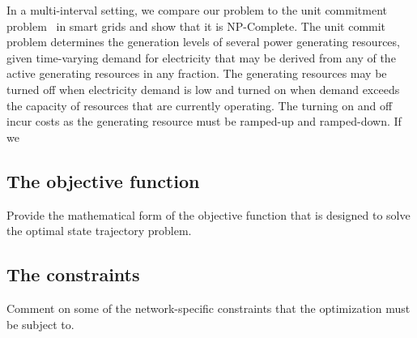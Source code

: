 In a multi-interval setting, we compare our problem to the unit commitment problem~\cite{unitcommit} in smart grids and show that it is NP-Complete. The unit commit problem determines the generation levels of several power generating resources, given time-varying demand for electricity that may be derived from any of the active generating resources in any fraction. The generating resources may be turned off when electricity demand is low and turned on when demand exceeds the capacity of resources that are currently operating. The turning on and off incur costs as the generating resource must be ramped-up and ramped-down. If we 


\subsection{The objective function} Provide the mathematical form of the objective function that is designed to solve the optimal state trajectory problem.
\subsection{The constraints} Comment on some of the network-specific constraints that the optimization must be subject to.

